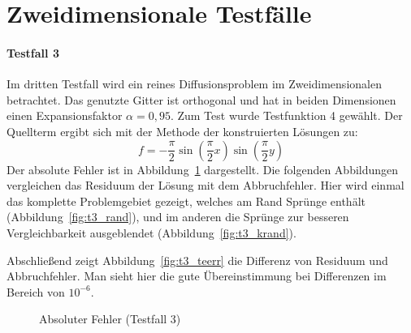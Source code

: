 \section{Zweidimensionale Testfälle}

\paragraph{Testfall 3}

Im dritten Testfall wird ein reines Diffusionsproblem im Zweidimensionalen
betrachtet. Das genutzte Gitter ist orthogonal und hat in beiden Dimensionen
einen Expansionsfaktor $\alpha=0,95$. Zum Test wurde Testfunktion 4
gewählt. Der Quellterm ergibt sich mit der Methode der konstruierten Lösungen zu:
\begin{equation}
  f=-\frac{\pi}{2} \sin\left(\frac{\pi}{2} x\right) \sin\left(\frac{\pi}{2} y\right)
\end{equation}
Der absolute Fehler ist in Abbildung~\ref{fig:t3_abs} dargestellt.
Die folgenden Abbildungen vergleichen das Residuum der Lösung mit dem
Abbruchfehler. Hier wird einmal das komplette Problemgebiet gezeigt, welches
am Rand Sprünge enthält (Abbildung~\ref{fig:t3_rand}), und im anderen die
Sprünge zur besseren Vergleichbarkeit ausgeblendet (Abbildung~\ref{fig:t3_krand}).

Abschließend zeigt Abbildung~\ref{fig:t3_teerr} die Differenz von Residuum und
Abbruchfehler. Man sieht hier die gute Übereinstimmung bei Differenzen
im Bereich von $10^{-6}$.

\begin{figure}[h]
\centering
\begin{subfigure}[b]{.5\linewidth}
\centering
{}
\end{subfigure}%
\begin{subfigure}[b]{.5\linewidth}
\centering
{}
\end{subfigure}
\caption{Absoluter Fehler (Testfall 3)}
\label{fig:t3_abs}
\end{figure}


